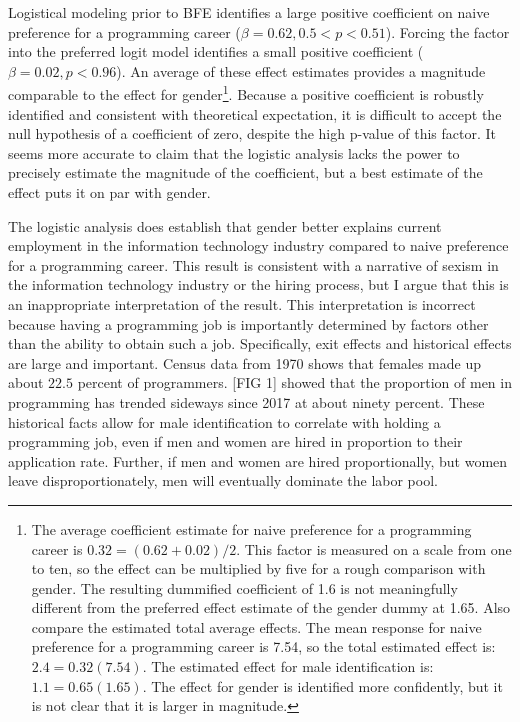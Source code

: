 \documentclass[review]{elsarticle}
\begin{document}
Logistical modeling prior to BFE identifies a large positive coefficient on naive preference for a programming career ($\beta = 0.62, 0.5 < p < 0.51$).
Forcing the factor into the preferred logit model identifies a small positive coefficient ($\beta = 0.02, p < 0.96$).
An average of these effect estimates provides a magnitude comparable to the effect for gender\footnote{
    The average coefficient estimate for naive preference for a programming career is $0.32 = (0.62 + 0.02) / 2$.
    This factor is measured on a scale from one to ten,
    so the effect can be multiplied by five for a rough comparison with gender.
    The resulting dummified coefficient of 1.6 is not meaningfully different from the preferred effect estimate of the
    gender dummy at 1.65.
    Also compare the estimated total average effects.
    The mean response for naive preference for a programming career is 7.54, so the total estimated effect is:
    $2.4 = 0.32(7.54)$.
    The estimated effect for male identification is:
    $1.1 = 0.65(1.65)$.
    The effect for gender is identified more confidently, but it is not clear that it is larger in magnitude.
}.
Because a positive coefficient is robustly identified and consistent with theoretical expectation,
it is difficult to accept the null hypothesis of a coefficient of zero,
despite the high p-value of this factor.
It seems more accurate to claim that the logistic analysis lacks the power to precisely estimate the magnitude of the coefficient,
but a best estimate of the effect puts it on par with gender.

The logistic analysis does establish that gender better explains current employment in the information technology industry
compared to naive preference for a programming career.
This result is consistent with a narrative of sexism in the information technology industry or the hiring process,
but I argue that this is an inappropriate interpretation of the result.
This interpretation is incorrect because having a programming job
is importantly determined by factors other than the ability to obtain such a job.
Specifically, exit effects and historical effects are large and important.
Census data from 1970 shows that females made up about $22.5$ percent of programmers\cite{gilchrist1974enumerating}.
[FIG 1] showed that the proportion of men in programming has trended sideways since 2017 at about ninety percent.
These historical facts allow for male identification to correlate with holding a programming job,
even if men and women are hired in proportion to their application rate.
Further, if men and women are hired proportionally, but women leave disproportionately,
men will eventually dominate the labor pool.
\end{document}
